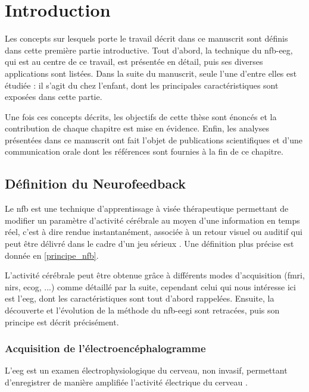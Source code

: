 \chapter{Introduction} \label{chapitre-1}

Les concepts sur lesquels porte le travail décrit dans ce manuscrit sont définis dans cette première partie introductive. Tout d'abord, la technique du \gls{nfb}-\gls{eeg}, 
qui est au centre de ce travail, est présentée en détail, puis ses diverses applications sont listées. Dans la suite du manuscrit, seule l'une d'entre elles est étudiée : 
il s'agit du  chez l'enfant, dont les principales caractéristiques sont exposées dans cette partie. 

Une fois ces concepts décrits, les objectifs de cette thèse sont énoncés et la contribution de chaque chapitre est mise en évidence. Enfin, les analyses 
présentées dans ce manuscrit ont fait l'objet de publications scientifiques et d'une communication orale dont les références sont fournies à la fin de ce chapitre. 

\clearpage 

\section{Définition du Neurofeedback}

Le \gls{nfb} est une technique d’apprentissage à visée thérapeutique permettant de modifier un paramètre d’activité cérébrale au moyen d’une 
information en temps réel, c'est à dire rendue instantanément, associée à un retour visuel ou auditif \citep{Arns2014} qui peut être délivré
dans le cadre d'un jeu sérieux \citep{Wang2010}. Une définition plus précise est donnée en \ref{principe_nfb}.

L'activité cérébrale peut être obtenue grâce à différents modes d'acquisition (\gls{fmri}, \gls{nirs}, \gls{ecog}, ...) comme détaillé par la suite, 
cependant celui qui nous intéresse ici est l'\gls{eeg}, dont les caractéristiques sont tout d'abord
rappelées. Ensuite, la découverte et l'évolution de la méthode du \gls{nfb}-\gls{eegi} sont retracées, puis son principe est décrit précisément.

\subsection{Acquisition de l'électroencéphalogramme} \label{eeg_definition}

L'\gls{eeg} est un examen électrophysiologique du cerveau, non invasif, permettant d’enregistrer de manière amplifiée l'activité électrique du cerveau \citep{Nunez2006}. 

